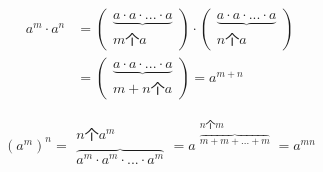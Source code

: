 
\begin{align}
	a^m \cdot a^n &= \left (\begin{matrix}\underbrace{a\cdot a \cdot... \cdot a}\\m 个a\end{matrix}\right) 
	\cdot \left(\begin{matrix}\underbrace{a\cdot a \cdot ...\cdot a}\\n个a\end{matrix}\right)\\
	&= \left (\begin{matrix}\underbrace{a\cdot a \cdot ...\cdot a}\\m+n 个a\end{matrix}\right) = a^{m+n}\\\\
\end{align}
\begin{align}	
	(a^m)^n = \begin{matrix} n 个 a^m\\ \overbrace{a^m\cdot a^m \cdot ...\cdot a^m}\end{matrix} 
	= a ^ {\begin{matrix} n 个 m\\ \overbrace{m+m+...+m}\end{matrix}} = a ^ {mn}
\end{align}
	